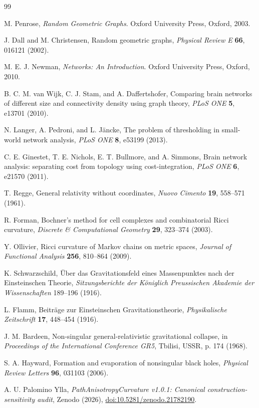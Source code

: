 \documentclass[11pt]{article}
\begin{document}
\begin{thebibliography}{99}

M. Penrose,
\emph{Random Geometric Graphs}.
Oxford University Press, Oxford, 2003.

J. Dall and M. Christensen,
Random geometric graphs,
\emph{Physical Review E} \textbf{66}, 016121 (2002).

M. E. J. Newman,
\emph{Networks: An Introduction}.
Oxford University Press, Oxford, 2010.

B. C. M. van Wijk, C. J. Stam, and A. Daffertshofer,
Comparing brain networks of different size and connectivity density using graph
theory,
\emph{PLoS ONE} \textbf{5}, e13701 (2010).

N. Langer, A. Pedroni, and L. J{\"a}ncke,
The problem of thresholding in small-world network analysis,
\emph{PLoS ONE} \textbf{8}, e53199 (2013).

C. E. Ginestet, T. E. Nichols, E. T. Bullmore, and A. Simmons,
Brain network analysis: separating cost from topology using cost-integration,
\emph{PLoS ONE} \textbf{6}, e21570 (2011).

T. Regge,
General relativity without coordinates,
\emph{Nuovo Cimento} \textbf{19}, 558--571 (1961).

R. Forman,
Bochner's method for cell complexes and combinatorial Ricci curvature,
\emph{Discrete \& Computational Geometry} \textbf{29}, 323--374 (2003).

Y. Ollivier,
Ricci curvature of Markov chains on metric spaces,
\emph{Journal of Functional Analysis} \textbf{256}, 810--864 (2009).

K. Schwarzschild,
{\"U}ber das Gravitationsfeld eines Massenpunktes nach der Einsteinschen Theorie,
\emph{Sitzungsberichte der K{\"o}niglich Preussischen Akademie der Wissenschaften}
189--196 (1916).

L. Flamm,
Beitr{\"a}ge zur Einsteinschen Gravitationstheorie,
\emph{Physikalische Zeitschrift} \textbf{17}, 448--454 (1916).

J. M. Bardeen,
Non-singular general-relativistic gravitational collapse,
in \emph{Proceedings of the International Conference GR5}, Tbilisi, USSR, p. 174
(1968).

S. A. Hayward,
Formation and evaporation of nonsingular black holes,
\emph{Physical Review Letters} \textbf{96}, 031103 (2006).

\raggedright
A. U. Palomino Ylla,
\emph{PathAnisotropyCurvature v1.0.1: Canonical construction-sensitivity audit},
Zenodo (2026),
\href{https://doi.org/10.5281/zenodo.21782190}{doi:10.5281/zenodo.21782190}.

\end{thebibliography}
\end{document}
